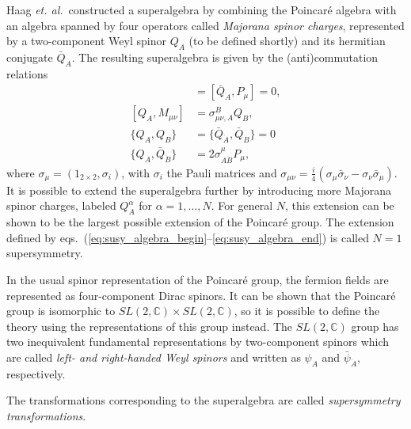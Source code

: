 \documentclass[twoside,english]{uiofysmaster}
\begin{document}
Haag {\it et. al.}\ constructed a superalgebra by combining the Poincar\'{e} algebra with an algebra spanned by four operators called {\it Majorana spinor charges}, represented by a two-component Weyl spinor $Q_A$ (to be defined shortly) and its hermitian conjugate $\bar Q_{\dot A}$. The resulting superalgebra is given by the (anti)commutation relations
\begin{align}
	[Q_A,P_\mu] &= [\bar Q_{\dot A}, P_\mu] = 0,\label{eq:susy_algebra_begin}\\
	[Q_A, M_{\mu\nu}] &= \sigma_{\mu\nu,A}^B Q_B,\\
	\{Q_A, Q_B\} &= \{\bar Q_{\dot A}, \bar Q_{\dot B} \} = 0\\
	\{Q_A, \bar Q_{\dot B} \} &= 2\sigma^\mu_{A \dot B} P_\mu,\label{eq:susy_algebra_end}
\end{align}
where $\sigma_\mu = (1_{2\times2},\sigma_i)$, with $\sigma_i$ the Pauli matrices and $\sigma_{\mu\nu} = \frac{i}{4}(\sigma_\mu \bar\sigma_\nu - \sigma_\nu \bar\sigma_\mu)$. It is possible to extend the superalgebra further by introducing more Majorana spinor charges, labeled $Q_A^\alpha$ for $\alpha=1,...,N$. For general $N$, this extension can be shown to be the largest possible extension of the Poincar\'{e} group. The extension defined by eqs.\ (\ref{eq:susy_algebra_begin}--\ref{eq:susy_algebra_end}) is called $N=1$ supersymmetry.

In the usual spinor representation of the Poincar\'{e} group, the fermion fields are represented as four-component Dirac spinors. It can be shown that the Poincar\'{e} group is isomorphic to $SL(2,\mathbb{C})\times SL(2,\mathbb{C})$, so it is possible to define the theory using the representations of this group instead. The $SL(2,\mathbb{C})$ group has two inequivalent fundamental representations by two-component spinors which are called {\it left- and right-handed Weyl spinors} and written as $\psi_A$ and $\bar\psi_{\dot A}$, respectively. 

The transformations corresponding to the superalgebra are called {\it supersymmetry transformations}.
\end{document}
